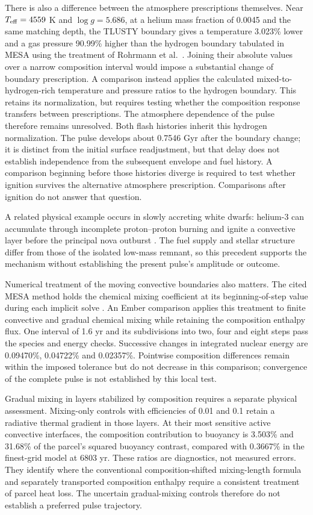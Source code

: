 \documentclass[11pt,letterpaper]{article}
\begin{document}
There is also a difference between the atmosphere prescriptions themselves.
Near $T_{\rm eff}=4559$ K and $\log g=5.686$, at a helium mass fraction of
0.0045 and the same matching depth, the TLUSTY boundary gives a temperature
3.023\% lower and a gas pressure 90.99\% higher than the hydrogen boundary
tabulated in MESA using the treatment of Rohrmann et al.\ \cite{rohrmann11,mesa_atm}.
Joining their absolute values over a narrow composition interval would impose
a substantial change of boundary prescription. A comparison instead applies
the calculated mixed-to-hydrogen-rich temperature and pressure ratios to the
hydrogen boundary. This retains its normalization, but requires testing whether
the composition response transfers between prescriptions. The atmosphere
dependence of the pulse therefore remains unresolved. Both flash histories
inherit this hydrogen normalization. The pulse develops about 0.7546 Gyr
after the boundary change; it is distinct from the initial surface
readjustment, but that delay does not establish independence from the
subsequent envelope and fuel history. A comparison beginning before those
histories diverge is required to test whether ignition survives the
alternative atmosphere prescription. Comparisons after ignition do not
answer that question.

A related physical example occurs in slowly accreting white dwarfs: helium-3
can accumulate through incomplete proton--proton burning and ignite a convective
layer before the principal nova outburst \cite{denissenkov13}. The fuel supply
and stellar structure differ from those of the isolated low-mass remnant, so
this precedent supports the mechanism without establishing the present pulse's
amplitude or outcome.

Numerical treatment of the moving convective boundaries also matters.
The cited MESA method holds the chemical mixing coefficient at its
beginning-of-step value during each implicit solve \cite{paxton11}.
An Ember comparison applies this treatment to finite convective and gradual
chemical mixing while retaining the composition enthalpy flux. One interval
of 1.6 yr and its subdivisions into two, four and eight steps pass the
species and energy checks. Successive changes in integrated nuclear energy
are 0.09470\%, 0.04722\% and 0.02357\%. Pointwise composition differences
remain within the imposed tolerance but do not decrease in this comparison;
convergence of the complete pulse is not established by this local test.

Gradual mixing in layers stabilized by composition requires a separate
physical assessment. Mixing-only controls with efficiencies of 0.01 and 0.1
retain a radiative thermal gradient in those layers. At their most sensitive
active convective interfaces, the composition contribution to buoyancy is
3.503\% and 31.68\% of the parcel's squared buoyancy contrast, compared with
0.3667\% in the finest-grid model at 6803 yr. These ratios are diagnostics,
not measured errors. They identify where the conventional composition-shifted
mixing-length formula and separately transported composition enthalpy require
a consistent treatment of parcel heat loss. The uncertain gradual-mixing
controls therefore do not establish a preferred pulse trajectory.
\end{document}
